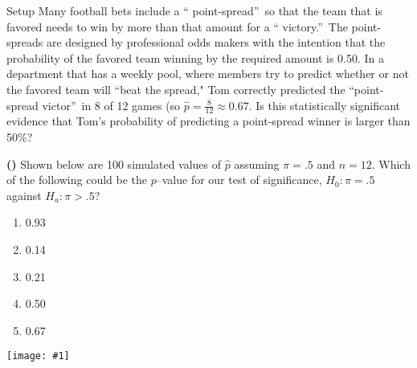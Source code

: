 \documentclass[13pt]{beamer}
\newcounter{count}
\newcommand{\question}{ \textbf{(\decimal{count})} \stepcounter{count}}
\newcommand{\pic}[2]{\hfill\texttt{[image: \#1]}\hspace*{\fill}}
\begin{document}

\begin{frame}{Setup}
Many football bets include a \textquotedblleft
point-spread\textquotedblright\ so that the team that is favored needs to win by more than that amount for a \textquotedblleft
victory.\textquotedblright\ The point-spreads are designed by professional odds makers with the intention that the probability of the favored team winning by the required amount is 0.50. In a department that has a weekly pool, where members try to predict whether or not the favored team will \textquotedblleft beat the spread," Tom correctly predicted the \textquotedblleft point-spread victor\textquotedblright\ in 8 of 12 games (so $\hat{p}=\frac{8}{12}\approx 0.67$. Is this statistically significant evidence that Tom's probability of predicting a point-spread winner is larger than 50\%?
\end{frame}

\begin{frame}
\question Shown below are 100 simulated values of $\hat{p}$ assuming $\pi=.5$ and $n=12$. Which of the following could be the $p$--value for our test of significance, $H_0:\pi=.5$ against $H_a:\pi>.5$?
\begin{multicols}{2}
\begin{enumerate}[A]
   \item 0.93
   \item 0.14
   \item 0.21 %
   \item 0.50
   \item 0.67
\end{enumerate}
\pic{pointspreadsim.PNG}{.9}
\end{multicols}
\end{frame}
\end{document}
